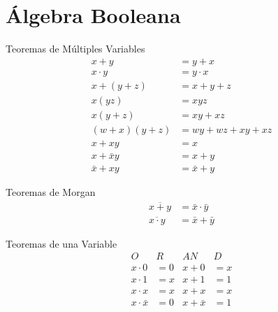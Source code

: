 
\section*{Álgebra Booleana}

\begin{minipage}{0.5\textwidth}
\begin{center} 
    Teoremas de Múltiples Variables
    \begin{align*}
        x + y &= y + x \\
        x \cdot y &= y \cdot x \\
        x + (y + z) &= x + y+ z \\
        x(yz) &= xyz \\
        x(y+z) &= xy + xz \\
        (w+x) (y+z) &= wy + wz + xy + xz \\
        x + xy &= x \\
        x + \bar x y &= x + y \\
        \bar x + xy &= \bar x + y
    \end{align*}
\end{center}
\end{minipage}
\begin{minipage}{0.5\textwidth}
\begin{center}
   Teoremas de Morgan
    \begin{align*}
        \overline{ x + y } &= \bar x \cdot \bar y \\
        \overline{ x \cdot y } &= \bar x + \bar y
    \end{align*} 
\end{center}
\begin{center}
    Teoremas de una Variable
    \begin{align*}
                 O&R       &        AN&D        \\
        x \cdot 0 &= 0     &    x + 0 &= x      \\
        x \cdot 1 &= x     &    x + 1 &= 1      \\
        x \cdot x &= x     &    x + x &= x      \\
        x \cdot\bar x &= 0 &    x + \bar x &= 1 
    \end{align*}
\end{center}
\end{minipage}

